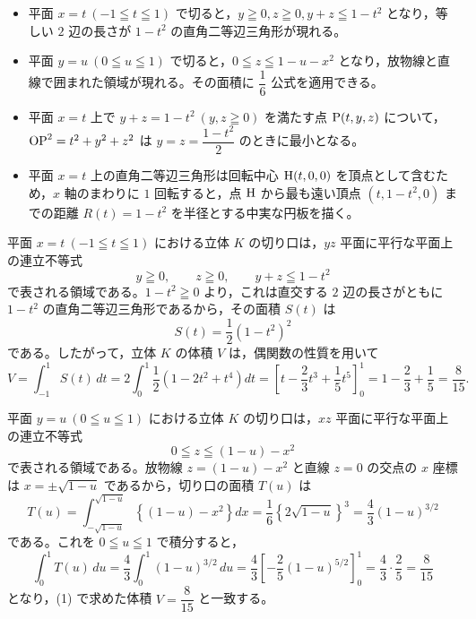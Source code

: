 

\begin{itemize}[leftmargin=1.6em,itemsep=2pt,topsep=2pt]
  \item[(1)] 平面 $x=t\ (-1\leqq t\leqq 1)$ で切ると，$y\geqq 0, z\geqq 0, y+z\leqq 1-t^{2}$ となり，等しい $2$ 辺の長さが $1-t^{2}$ の直角二等辺三角形が現れる。
  \item[(2)] 平面 $y=u\ (0\leqq u\leqq 1)$ で切ると，$0\leqq z\leqq 1-u-x^{2}$ となり，放物線と直線で囲まれた領域が現れる。その面積に $\dfrac{1}{6}$ 公式を適用できる。
  \item[(3)] 平面 $x=t$ 上で $y+z=1-t^{2}\ (y,z\geqq 0)$ を満たす点 $\mathrm{P}(t, y, z)$ について，$\mathrm{OP}^{2}=t^{2}+y^{2}+z^{2}$ は $y=z=\dfrac{1-t^{2}}{2}$ のときに最小となる。
  \item[(4)] 平面 $x=t$ 上の直角二等辺三角形は回転中心 $\mathrm{H}(t, 0, 0)$ を頂点として含むため，$x$ 軸のまわりに $1$ 回転すると，点 $\mathrm{H}$ から最も遠い頂点 $(t, 1-t^{2}, 0)$ までの距離 $R(t)=1-t^{2}$ を半径とする中実な円板を描く。
\end{itemize}

平面 $x=t\ (-1\leqq t\leqq 1)$ における立体 $K$ の切り口は，$yz$ 平面に平行な平面上の連立不等式
\[
  y \geqq 0,\qquad z \geqq 0,\qquad y + z \leqq 1 - t^{2}
\]
で表される領域である。$1-t^{2}\geqq 0$ より，これは直交する $2$ 辺の長さがともに $1-t^{2}$ の直角二等辺三角形であるから，その面積 $S(t)$ は
\[
  S(t) = \frac{1}{2}\left(1-t^{2}\right)^{2}
\]
である。したがって，立体 $K$ の体積 $V$ は，偶関数の性質を用いて
\[
  V = \int_{-1}^{1}S(t)\,dt = 2\int_{0}^{1}\frac{1}{2}\left(1-2t^{2}+t^{4}\right)dt
  = \left[t-\frac{2}{3}t^{3}+\frac{1}{5}t^{5}\right]_{0}^{1}
  = 1 - \frac{2}{3} + \frac{1}{5} = \frac{8}{15}.
\]


平面 $y=u\ (0\leqq u\leqq 1)$ における立体 $K$ の切り口は，$xz$ 平面に平行な平面上の連立不等式
\[
  0 \leqq z \leqq (1-u) - x^{2}
\]
で表される領域である。放物線 $z=(1-u)-x^{2}$ と直線 $z=0$ の交点の $x$ 座標は $x=\pm\sqrt{1-u}$ であるから，切り口の面積 $T(u)$ は
\[
  T(u) = \int_{-\sqrt{1-u}}^{\sqrt{1-u}}\left\{(1-u)-x^{2}\right\}dx
  = \frac{1}{6}\left\{2\sqrt{1-u}\right\}^{3} = \frac{4}{3}(1-u)^{3/2}
\]
である。これを $0\leqq u\leqq 1$ で積分すると，
\[
  \int_{0}^{1}T(u)\,du = \frac{4}{3}\int_{0}^{1}(1-u)^{3/2}\,du
  = \frac{4}{3}\left[-\frac{2}{5}(1-u)^{5/2}\right]_{0}^{1}
  = \frac{4}{3}\cdot\frac{2}{5} = \frac{8}{15}
\]
となり，(1) で求めた体積 $V=\dfrac{8}{15}$ と一致する。


